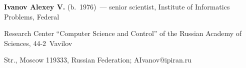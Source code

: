 \vspace*{3pt}





\noindent


\textbf{Ivanov Alexey V.} (b.\ 1976)~--- senior scientist, Institute of Informatics Problems, Federal 


Research Center ``Computer Science and Control'' of the Russian Academy of Sciences, 44-2~Vavilov 


Str., Moscow 119333, Russian Federation; \mbox{AIvanov@ipiran.ru}








\label{end\stat}





\renewcommand{\bibname}{\protect\rm Литература} 


